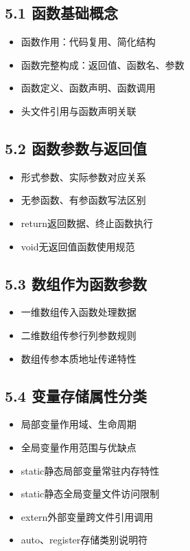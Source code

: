 \subsection{5.1 函数基础概念}
\begin{itemize}
\item 函数作用：代码复用、简化结构
\item 函数完整构成：返回值、函数名、参数
\item 函数定义、函数声明、函数调用
\item 头文件引用与函数声明关联
\end{itemize}

\subsection{5.2 函数参数与返回值}
\begin{itemize}
\item 形式参数、实际参数对应关系
\item 无参函数、有参函数写法区别
\item return返回数据、终止函数执行
\item void无返回值函数使用规范
\end{itemize}

\subsection{5.3 数组作为函数参数}
\begin{itemize}
\item 一维数组传入函数处理数据
\item 二维数组传参行列参数规则
\item 数组传参本质地址传递特性
\end{itemize}

\subsection{5.4 变量存储属性分类}
\begin{itemize}
\item 局部变量作用域、生命周期
\item 全局变量作用范围与优缺点
\item static静态局部变量常驻内存特性
\item static静态全局变量文件访问限制
\item extern外部变量跨文件引用调用
\item auto、register存储类别说明符
\end{itemize}


